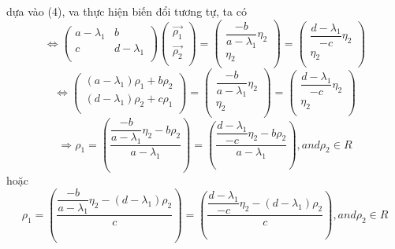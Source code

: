 \documentclass[a4paper]{article}
\begin{document}
    dựa vào (4), va thực hiện biến đổi tương tự, ta có
    \begin{equation*}
        \Leftrightarrow
        \begin{pmatrix}
            a-\lambda_1 & b         \\
            c         & d-\lambda_1 \\
        \end{pmatrix}
        \begin{pmatrix}
            \vec{\rho_1} \\
            \vec{\rho_2} \\
        \end{pmatrix}
        =
        \begin{pmatrix}
            \dfrac{-b}{a-\lambda_1}\eta_2 \\
            \eta_2 \\
        \end{pmatrix}
        =
        \begin{pmatrix}
            \dfrac{d - \lambda_1}{-c}\eta_2 \\
            \eta_2 \\
        \end{pmatrix}
    \end{equation*}
    \begin{equation*}
        \Leftrightarrow
        \begin{pmatrix}
        (a-\lambda_1) \rho_1 + b \rho_2         \\
        (d-\lambda_1) \rho_2 + c \rho_1 \\
        \end{pmatrix}
        =
        \begin{pmatrix}
            \dfrac{-b}{a-\lambda_1}\eta_2 \\
            \eta_2 \\
        \end{pmatrix}
        =
        \begin{pmatrix}
            \dfrac{d - \lambda_1}{-c}\eta_2 \\
            \eta_2 \\
        \end{pmatrix}
    \end{equation*}
    \begin{equation*}
        \Rightarrow
        \rho_1
            = (\dfrac{\dfrac{-b}{a - \lambda_1}\eta_2 - b \rho_2}{a - \lambda_1})
            = (\dfrac{\dfrac{d - \lambda_1}{-c}\eta_2 -b \rho_2}{a - \lambda_1})
            , and \rho_2 \in R
    \end{equation*}
    hoặc
    \begin{equation*}
        \rho_1
            = (\dfrac{\dfrac{-b}{a - \lambda_1}\eta_2 -(d - \lambda_1) \rho_2}{c})
            = (\dfrac{\dfrac{d - \lambda_1}{-c}\eta_2 -(d - \lambda_1) \rho_2}{c})
            , and \rho_2 \in R
    \end{equation*}
\end{document}
